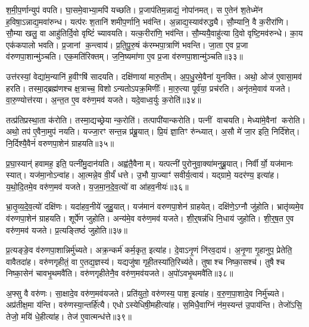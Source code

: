 श॒मी॒प॒र्णान्युप॑ वपति।
घा॒समे॒वाभ्या॒मपि॑ यच्छति।
प्र॒जाप॑तिम॒न्नाद्यं॒ नोपा॑नमत्।
स ए॒तेन॑ श॒तेध्मे॑न ह॒विषा॒\-ऽन्नाद्य॒मवा॑रुन्ध।
यत्प॑रः श॒तानि॑ शमीप॒र्णानि॒ भव॑न्ति।
अ॒न्नाद्य॒स्याव॑रुद्ध्यै।
सौ॒म्यानि॒ वै क॒रीरा॑णि।
सौ॒म्या खलु॒ वा आहु॑तिर्दि॒वो वृष्टिं॑ च्यावयति।
यत्क॒रीरा॑णि॒ भव॑न्ति।
सौ॒म्ययै॒वाहु॑त्या दि॒वो वृष्टि॒मव॑रुन्धे।
का॒य एक॑कपालो भवति।
प्र॒जानां क॒न्त्वाय॑।
प्र॒ति॒पू॒रु॒षं क॑रम्भपा॒त्राणि॑ भवन्ति।
जा॒ता ए॒व प्र॒जा व॑रुणपा॒शान्मु॑ञ्चति।
एक॒मति॑रिक्तम्।
ज॒नि॒ष्यमा॑णा ए॒व प्र॒जा व॑रुणपा॒शान्मु॑ञ्चति॥३३॥\anuvakamend[नि॒रु॒प्यन्ते॑ भवतो॒ भव॑ति मेध्य॒त्वाय॑ रुन्धे॒ षट्च॑]

उत्त॑रस्यां॒ वेद्या॑म॒न्यानि॑ ह॒वीꣳषि॑ सादयति।
दक्षि॑णायां मारु॒तीम्।
अ॒प॒धु॒रमे॒वैना॑ युनक्ति।
अथो॒ ओज॑ ए॒वासा॒मव॑ हरति।
तस्मा॒द्ब्रह्म॑णश्च क्ष॒त्राच्च॒ विशो\-ऽन्यतो\-ऽपक्र॒मिणीः᳚।
मा॒रु॒त्या पूर्व॑या॒ प्रच॑रति।
अनृ॑तमे॒वाव॑ यजते।
वा॒रु॒ण्योत्त॑रया।
अ॒न्त॒त ए॒व वरु॑ण॒मव॑ यजते।
यदे॒वाध्व॒र्युः क॒रोति॑॥३४॥

तत्प्र॑तिप्रस्था॒ता क॑रोति।
तस्मा॒द्यच्छ्रेयान्क॒रोति॑।
तत्पापी॑यान्करोति।
पत्नीं वाचयति।
मेध्या॑मे॒वैनां करोति।
अथो॒ तप॑ ए॒वैना॒मुप॑ नयति।
यज्जा॒रꣳ सन्त॒न्न प्र॑ब्रू॒यात्।
प्रि॒यं ज्ञा॒तिꣳ रु॑न्ध्यात्।
अ॒सौ मे॑ जा॒र इति॒ निर्दि॑शेत्।
नि॒र्दिश्यै॒वैनं॑ वरुणपा॒शेन॑ ग्राहयति॥३५॥

प्र॒घा॒स्यान्॑ हवामह॒ इति॒ पत्नी॑मु॒दान॑यति।
अह्व॑तै॒वैनाम्।
यत्पत्नी॑ पुरोनुवा॒क्या॑मनुब्रू॒यात्।
निर्वीर्यो॒ यज॑मानः स्यात्।
यज॑मा॒नो\-ऽन्वा॑ह।
आ॒त्मन्ने॒व वी॒र्यं॑ धत्ते।
उ॒भौ या॒ज्याꣳ॑ सवीर्य॒त्वाय॑।
यद्ग्रामे॒ यदर॑ण्य॒ इत्या॑ह।
य॒थो॒दि॒तमे॒व वरु॑ण॒मव॑ यजते।
य॒ज॒मा॒न॒दे॒व॒त्यो॑ वा आ॑हव॒नीयः॑॥३६॥

भ्रा॒तृ॒व्य॒दे॒व॒त्यो॑ दक्षि॑णः।
यदा॑हव॒नीये॑ जुहु॒यात्।
यज॑मानं वरुणपा॒शेन॑ ग्राहयेत्।
दक्षि॑णे॒\-ऽग्नौ जु॑होति।
भ्रातृ॑व्यमे॒व व॑रुणपा॒शेन॑ ग्राहयति।
शूर्पे॑ण जुहोति।
अन्य॑मे॒व वरु॑ण॒मव॑ यजते।
शी॒र्॒षन्न॑धि नि॒धाय॑ जुहोति।
शी॒र्॒\mbox{}ष॒त ए॒व वरु॑ण॒मव॑ यजते।
प्र॒त्यङ्तिष्ठं॑ जुहोति॥३७॥

प्र॒त्यङ्ङे॒व व॑रुणपा॒शान्निर्मु॑च्यते।
अक्र॒न्कर्म॑ कर्म॒कृत॒ इत्या॑ह।
दे॒वा\-ऽनृ॒णं नि॑रव॒दाय॑।
अ॒नृ॒णा गृ॒हानुप॒ प्रेतेति॒ वावैतदा॑ह।
वरु॑णगृहीतं॒ वा ए॒तद्य॒ज्ञस्य॑।
यद्यजु॑षा गृही॒तस्या॑ति॒रिच्य॑ते।
तुषाश्च निष्का॒सश्च॑।
तुषैश्च निष्का॒सेन॑ चावभृ॒थमवै॑ति।
वरु॑णगृहीतेनै॒व वरु॑ण॒मव॑यजते।
अ॒पो॑\-ऽवभृ॒थमवै॑ति॥३८॥

अ॒फ्सु वै वरु॑णः।
सा॒क्षादे॒व वरु॑ण॒मव॑यजते।
प्रति॑युतो॒ वरु॑णस्य॒ पाश॒ इत्या॑ह।
व॒रु॒ण॒पा॒शादे॒व निर्मु॑च्यते।
अप्र॑तीक्ष॒मा य॑न्ति।
वरु॑णस्या॒न्तर्\mbox{}हि॑त्यै।
एधोऽस्येधिषी॒मही\-त्या॑ह।
स॒मिधै॒वाग्निं न॑म॒स्यन्त॑ उ॒पाय॑न्ति।
तेजो॑ऽसि॒ तेजो॒ मयि॑ धे॒हीत्या॑ह।
तेज॑ ए॒वात्मन्ध॑त्ते॥३९॥

